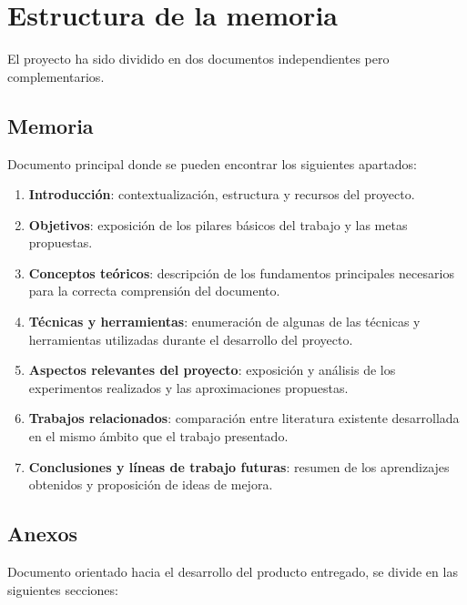 \section{Estructura de la memoria}

El proyecto ha sido dividido en dos documentos independientes pero complementarios.

\subsection{Memoria}

Documento principal donde se pueden encontrar los siguientes apartados:

\begin{enumerate}
	\item \textbf{Introducción}: contextualización, estructura y recursos del proyecto.
	\item \textbf{Objetivos}: exposición de los pilares básicos del trabajo y las metas propuestas.
	\item \textbf{Conceptos teóricos}: descripción de los fundamentos principales necesarios para la correcta comprensión del documento.
	\item \textbf{Técnicas y herramientas}: enumeración de algunas de las técnicas y herramientas utilizadas durante el desarrollo del proyecto.
	\item \textbf{Aspectos relevantes del proyecto}: exposición y análisis de los experimentos realizados y las aproximaciones propuestas.
	\item \textbf{Trabajos relacionados}: comparación entre literatura existente desarrollada en el mismo ámbito que el trabajo presentado.
	\item \textbf{Conclusiones y líneas de trabajo futuras}: resumen de los aprendizajes obtenidos y proposición de ideas de mejora.
\end{enumerate}

\subsection{Anexos}

Documento orientado hacia el desarrollo del producto entregado, se divide en las siguientes secciones:

